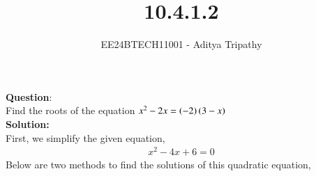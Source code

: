 \documentclass[journal]{IEEEtran}
\begin{document}

\vspace{3cm}

\title{10.4.1.2}
\author{EE24BTECH11001 - Aditya Tripathy}
 \maketitle
{\let\newpage\relax\maketitle}

\renewcommand{\thefigure}{\theenumi}
\renewcommand{\thetable}{\theenumi}
\setlength{\intextsep}{10pt} %


\renewcommand{\thetable}{\theenumi}


\textbf{Question}:\\
Find the roots of the equation $x^2 - 2x = \left(-2\right)\left(3-x\right)$
\\
\textbf{Solution: }\\
First, we simplify the given equation,
\begin{align}
   x^2 - 4x + 6 = 0 
\end{align}
Below are two methods to find the solutions of this quadratic equation,
\end{document}
